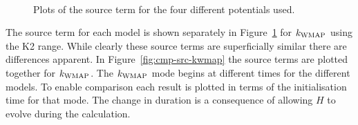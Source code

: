 \begin{figure}[h]
\centering%
\qquad%
\\%
\qquad%
\caption[The source term for different potentials]{Plots of the source term for the
four different potentials used.}
\label{fig:sourcecomparison-res}
\end{figure}
% 
The source term for each model is shown separately in Figure~\ref{fig:sourcecomparison-res} for
$k_\mathrm{WMAP}$ using the K2 range\footnotemark. 
% 
% 
While clearly these source terms are superficially similar
there are differences apparent. In Figure~\ref{fig:cmp-src-kwmap} the source terms are plotted
together for $k_\mathrm{WMAP}$. The $k_\mathrm{WMAP}$ mode begins at different times for the
different models. To enable comparison each result is plotted in terms of the
initialisation time for that mode.  The change in duration is a consequence of
allowing $H$ to evolve during the calculation. 

